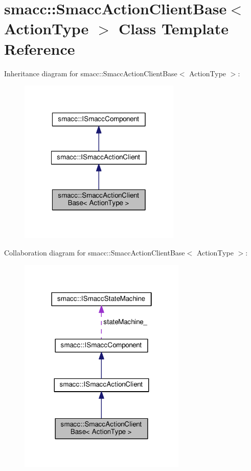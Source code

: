 \hypertarget{classsmacc_1_1SmaccActionClientBase}{\section{smacc\-:\-:Smacc\-Action\-Client\-Base$<$ Action\-Type $>$ Class Template Reference}
\label{classsmacc_1_1SmaccActionClientBase}
}


Inheritance diagram for smacc\-:\-:Smacc\-Action\-Client\-Base$<$ Action\-Type $>$\-:
\nopagebreak
\begin{figure}[H]
\begin{center}
\leavevmode
\includegraphics[width=218pt]{classsmacc_1_1SmaccActionClientBase__inherit__graph}
\end{center}
\end{figure}


Collaboration diagram for smacc\-:\-:Smacc\-Action\-Client\-Base$<$ Action\-Type $>$\-:
\nopagebreak
\begin{figure}[H]
\begin{center}
\leavevmode
\includegraphics[width=226pt]{classsmacc_1_1SmaccActionClientBase__coll__graph}
\end{center}
\end{figure}

